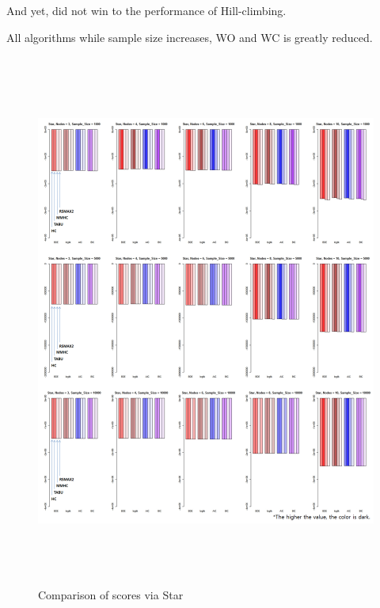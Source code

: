 And yet, did not win to the performance of Hill-climbing.

All algorithms while sample size increases, WO and WC is greatly reduced.
	
	\begin{figure}[p]
	\centering
		\includegraphics[height=500pt]{03_Star_Score}
		\caption{Comparison of scores via Star}
	\end{figure}	

